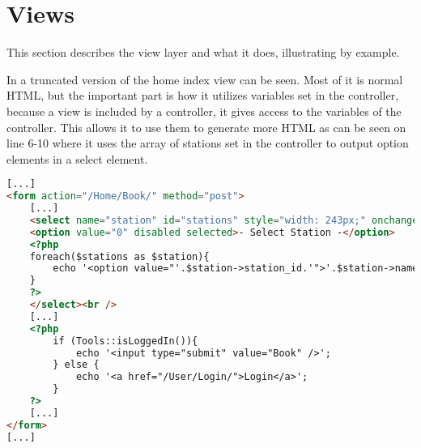 \section{Views}
This section describes the view layer and what it does, illustrating by example.

In  a truncated version of the home index view can be seen. 
Most of it is normal HTML, but the important part is how it utilizes variables set in the controller, because a view is included by a controller, it gives access to the variables of the controller. 
This allows it to use them to generate more HTML as can be seen on line 6-10 where it uses the array of stations set in the controller to output option elements in a select element.

\begin{lstlisting}[language=html, label=lst:homeIndexView, caption={Home Index View}]
[...]
<form action="/Home/Book/" method="post">
    [...]
    <select name="station" id="stations" style="width: 243px;" onchange="UpdateMarker()">
    <option value="0" disabled selected>- Select Station -</option>
    <?php
    foreach($stations as $station){
        echo '<option value="'.$station->station_id.'">'.$station->name.'</option>';
    }
    ?>
    </select><br />
    [...]
    <?php
        if (Tools::isLoggedIn()){
            echo '<input type="submit" value="Book" />';
        } else {
            echo '<a href="/User/Login/">Login</a>';
        }
    ?>
    [...]
</form>
[...]
\end{lstlisting}
